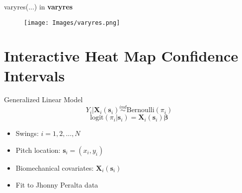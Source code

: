 \documentclass{beamer}
\begin{document}
%
%
%
%
%
%
%
%
\begin{frame}{varyres(...) in {\bf varyres}}
  \begin{figure}[H]
	\centering
	\texttt{[image: Images/varyres.png]}
	\end{figure}
	\end{frame}

\section{Interactive Heat Map Confidence Intervals}

\begin{frame}{Generalized Linear Model}{}
$$Y_{i}|\mathbf{X}_{i}(\mathbf{s}_{i}) \stackrel{ind}{\sim} \mbox{Bernoulli}(\pi_{i}) $$
$$ \text{logit}(\pi_{i}|\pmb{s}_{i}) = \mathbf{X}_{i}(\mathbf{s}_{i})\pmb{\beta} $$
\begin{itemize}
  \addtolength{\itemsep}{0.5\baselineskip}
\item Swings: $i = 1,2,\ldots, N$
\item Pitch location: $\mathbf{s}_{i} = (x_{i},y_{i})$
\item Biomechanical covariates: $\mathbf{X}_{i}(\mathbf{s}_{i})$
\item Fit to Jhonny Peralta data
\end{itemize}

\end{frame}
\end{document}
